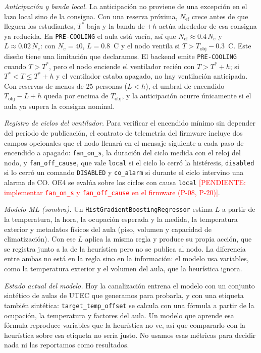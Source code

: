 \documentclass[manuscript,screen,nonacm,natbib=false]{acmart}
\newcommand{\pendiente}[1]{\textcolor{red}{[PENDIENTE: #1]}}
\newcommand{\gradC}{\textdegree{}C}
\begin{document}
\textit{Anticipación y banda local.} La anticipación no proviene de una excepción en el lazo local sino de la consigna. Con una reserva próxima, $N_{\mathrm{ef}}$ crece antes de que lleguen los estudiantes, $T^{*}$ baja y la banda de $\pm h$ actúa alrededor de esa consigna ya reducida. En \texttt{PRE-COOLING} el aula está vacía, así que $N_{\mathrm{ef}} \approx 0.4\,N_e$ y $L \approx 0.02\,N_e$: con $N_e = 40$, $L = 0.8$~\gradC{} y el nodo ventila si $T > T_{\mathrm{obj}} - 0.3$~\gradC{}. Este diseño tiene una limitación que declaramos. El backend emite \texttt{PRE-COOLING} cuando $T > T^{*}$, pero el nodo enciende el ventilador recién con $T > T^{*} + h$; si $T^{*} < T \leq T^{*} + h$ y el ventilador estaba apagado, no hay ventilación anticipada. Con reservas de menos de 25 personas ($L < h$), el umbral de encendido $T_{\mathrm{obj}} - L + h$ queda por encima de $T_{\mathrm{obj}}$, y la anticipación ocurre únicamente si el aula ya supera la consigna nominal.

\textit{Registro de ciclos del ventilador.} Para verificar el encendido mínimo sin depender del periodo de publicación, el contrato de telemetría del firmware incluye dos campos opcionales que el nodo llenará en el mensaje siguiente a cada paso de encendido a apagado: \texttt{fan\_on\_s}, la duración del ciclo medida con el reloj del nodo, y \texttt{fan\_off\_cause}, que vale \texttt{local} si el ciclo lo cerró la histéresis, \texttt{disabled} si lo cerró un comando \texttt{DISABLED} y \texttt{co\_alarm} si durante el ciclo intervino una alarma de CO. OE4 se evalúa sobre los ciclos con causa \texttt{local} \pendiente{implementar \texttt{fan\_on\_s} y \texttt{fan\_off\_cause} en el firmware (P-08, P-20)}.

\textit{Modelo ML (sombra).} Un \texttt{HistGradientBoostingRegressor} estima $L$ a partir de la temperatura, la hora, la ocupación esperada y la medida, la temperatura exterior y metadatos físicos del aula (piso, volumen y capacidad de climatización). Con ese $L$ aplica la misma regla y produce su propia acción, que se registra junto a la de la heurística pero no se publica al nodo. La diferencia entre ambas no está en la regla sino en la información: el modelo usa variables, como la temperatura exterior y el volumen del aula, que la heurística ignora.

\textit{Estado actual del modelo.} Hoy la canalización entrena el modelo con un conjunto sintético de aulas de UTEC que generamos para probarla, y con una etiqueta también sintética: \texttt{target\_temp\_offset} se calcula con una fórmula a partir de la ocupación, la temperatura y factores del aula. Un modelo que aprende esa fórmula reproduce variables que la heurística no ve, así que compararlo con la heurística sobre esa etiqueta no sería justo. No usamos esas métricas para decidir nada ni las reportamos como resultados.
\end{document}
